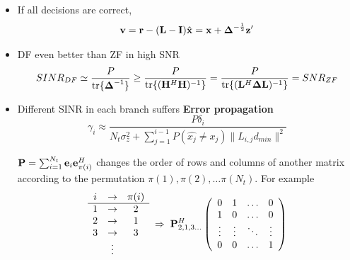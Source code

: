 \documentclass[xcolor=dvipsnames,aspectratio=169]{beamer}
\begin{document}
{        \pagebreak

     \begin{itemize}
      \item If all decisions are correct, 
         $$\mathbf{v}=\mathbf{r}-(\mathbf{L}-\mathbf{I})\hat{\mathbf{x}}=\mathbf{x}+\mathbf{\boldsymbol{\Delta}}^{-\frac{1}{2}}\mathbf{z}'$$
        \item DF even better than ZF in high SNR
            $$SINR_{DF}\simeq \frac{P}{\textnormal{tr}\{\mathbf{\boldsymbol{\Delta}}^{-1}\}}\geq\frac{P}{\textnormal{tr}\{(\mathbf{H}^H\mathbf{H})^{-1}\}}=\frac{P}{\textnormal{tr}\{(\mathbf{L}^H\mathbf{\boldsymbol{\Delta}}\mathbf{L})^{-1}\}}=SNR_{ZF}$$
     \end{itemize}

\pagebreak

\begin{itemize}
 \item Different SINR in each branch suffers \textbf{Error propagation}
 $$\gamma_i\approx\frac{P\delta_i}{N_t\sigma_z^2+\sum_{j=1}^{i-1}P(\hat{x_j}\neq x_j)\|L_{i,j}d_{min}\|^2}$$
 \begin{definition}
  $\mathbf{P}=\sum_{i=1}^{N_t}\mathbf{e}_i\mathbf{e}_{\pi(i)}^H$ changes the order of rows and columns of another matrix according to the permutation $\pi(1),\pi(2),\dots \pi(N_t)$. For example
   $$\begin{array}{ccc}i&\to&\pi(i)\\\hline
      1&\to&2\\
      2&\to&1\\
      3&\to&3\\
      &\vdots&\\
     \end{array}\;\Rightarrow\;
\mathbf{P}_{2,1,3\dots}^H\left(\begin{array}{cccc}
             0 & 1 & \dots & 0\\
             1 & 0 & \dots & 0\\
             \vdots & \vdots & \ddots & \vdots\\
             0 & 0 & \dots & 1\\
            \end{array}\right)$$
 \end{definition}
\end{itemize}

}
\end{document}
